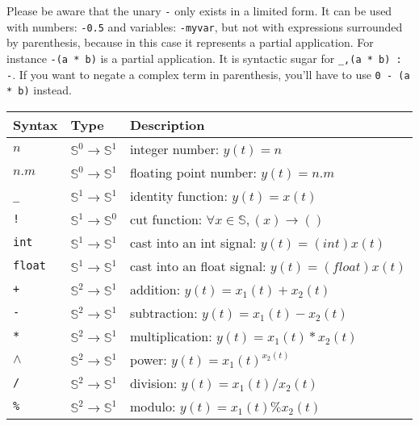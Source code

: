Please be aware that the unary \lstinline|-| only exists in a limited form. It can be used with numbers: \lstinline|-0.5| and variables: \lstinline|-myvar|, but not with expressions surrounded by parenthesis, because in this case it represents a partial application.  For instance   \lstinline|-(a * b)| is a partial application. It is syntactic sugar for \lstinline|_,(a * b) : -|. If you want to negate a complex term in parenthesis, you'll have to use \lstinline|0 - (a * b)| instead.

\bigskip

\begin{tabular}{|l|l|l|}
\hline
\textbf{Syntax} & \textbf{Type}  & \textbf{Description} \\
\hline
$n$ & $\mathbb{S}^{0}\rightarrow\mathbb{S}^{1}$ & integer number: $y(t)=n$ \\
$n.m$ & $\mathbb{S}^{0}\rightarrow\mathbb{S}^{1}$ & floating point number: $y(t)=n.m$ \\

\texttt{\_} & $\mathbb{S}^{1}\rightarrow\mathbb{S}^{1}$ & identity function: $y(t)=x(t)$ \\
\texttt{!} & $\mathbb{S}^{1}\rightarrow\mathbb{S}^{0}$ & cut function: $\forall x\in\mathbb{S},(x)\rightarrow ()$\\

\texttt{int} & $\mathbb{S}^{1}\rightarrow\mathbb{S}^{1}$ & cast into an int signal: $y(t)=(int)x(t)$  \\
\texttt{float} & $\mathbb{S}^{1}\rightarrow\mathbb{S}^{1}$ & cast into an float signal: $y(t)=(float)x(t)$  \\

\texttt{+} & $\mathbb{S}^{2}\rightarrow\mathbb{S}^{1}$ & addition: $y(t)=x_{1}(t)+x_{2}(t)$  \\
\texttt{-} & $\mathbb{S}^{2}\rightarrow\mathbb{S}^{1}$ & subtraction: $y(t)=x_{1}(t)-x_{2}(t)$   \\
\texttt{*} & $\mathbb{S}^{2}\rightarrow\mathbb{S}^{1}$ & multiplication: $y(t)=x_{1}(t)*x_{2}(t)$   \\
\texttt{$\land$} & $\mathbb{S}^{2}\rightarrow\mathbb{S}^{1}$ & power: $y(t)=x_{1}(t)^{x_{2}(t)}$   \\
\texttt{/} & $\mathbb{S}^{2}\rightarrow\mathbb{S}^{1}$ & division: $y(t)=x_{1}(t)/x_{2}(t)$   \\
\texttt{\%} & $\mathbb{S}^{2}\rightarrow\mathbb{S}^{1}$ & modulo: $y(t)=x_{1}(t)\%x_{2}(t)$   \\


\end{tabular}
